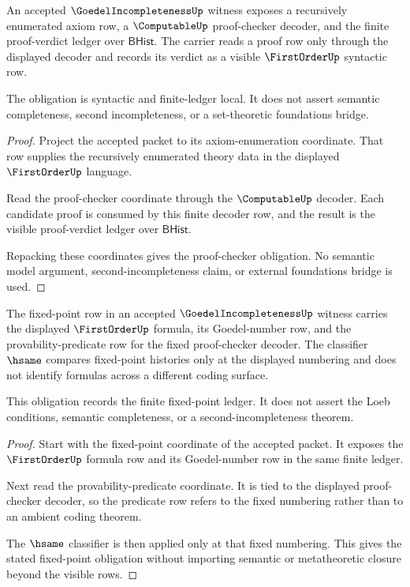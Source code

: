 \begin{theorem}
\label{thm:goedelincompleteness-proof-checker-obligation}
An accepted $\GoedelIncompletenessUp$ witness exposes a recursively enumerated
axiom row, a $\ComputableUp$ proof-checker decoder, and the finite
proof-verdict ledger over $\mathsf{BHist}$. The carrier reads a proof row only
through the displayed decoder and records its verdict as a visible
$\FirstOrderUp$ syntactic row.

The obligation is syntactic and finite-ledger local. It does not assert
semantic completeness, second incompleteness, or a set-theoretic foundations
bridge.
\end{theorem}
\begin{proof}
Project the accepted packet to its axiom-enumeration coordinate. That row
supplies the recursively enumerated theory data in the displayed
$\FirstOrderUp$ language.

Read the proof-checker coordinate through the $\ComputableUp$ decoder. Each
candidate proof is consumed by this finite decoder row, and the result is the
visible proof-verdict ledger over $\mathsf{BHist}$.

Repacking these coordinates gives the proof-checker obligation. No semantic
model argument, second-incompleteness claim, or external foundations bridge is
used.
\end{proof}

\begin{theorem}
\label{thm:goedelincompleteness-fixed-point-obligation}
The fixed-point row in an accepted $\GoedelIncompletenessUp$ witness carries
the displayed $\FirstOrderUp$ formula, its Goedel-number row, and the
provability-predicate row for the fixed proof-checker decoder. The classifier
$\hsame$ compares fixed-point histories only at the displayed numbering and
does not identify formulas across a different coding surface.

This obligation records the finite fixed-point ledger. It does not assert the
Loeb conditions, semantic completeness, or a second-incompleteness theorem.
\end{theorem}
\begin{proof}
Start with the fixed-point coordinate of the accepted packet. It exposes the
$\FirstOrderUp$ formula row and its Goedel-number row in the same finite
ledger.

Next read the provability-predicate coordinate. It is tied to the displayed
proof-checker decoder, so the predicate row refers to the fixed numbering
rather than to an ambient coding theorem.

The $\hsame$ classifier is then applied only at that fixed numbering. This
gives the stated fixed-point obligation without importing semantic or
metatheoretic closure beyond the visible rows.
\end{proof}

